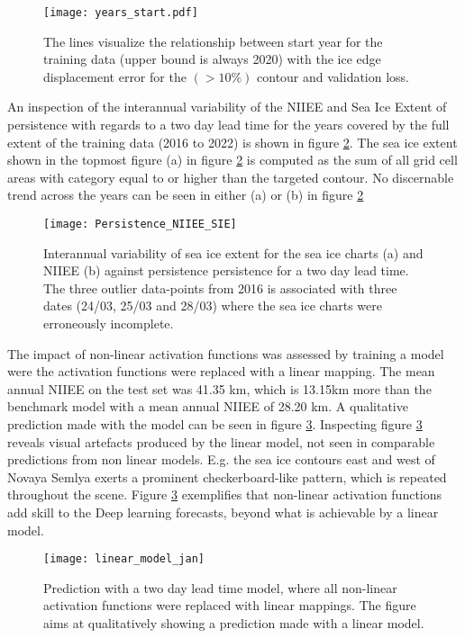 \documentclass[../main/thesis]{subfiles}
\begin{document}
\begin{figure}
    \centering
    \texttt{[image: years\_start.pdf]}
    \caption{\label{fig:append_years}The lines visualize the relationship between start year for the training data (upper bound is always 2020) with the ice edge displacement error for the $(> 10\%)$ contour and validation loss.}
\end{figure}

An inspection of the interannual variability of the NIIEE and Sea Ice Extent of persistence with regards to a two day lead time for the years covered by the full extent of the training data (2016 to 2022) is shown in figure \ref{fig:NIIEE-and-SIE}. The sea ice extent shown in the topmost figure (a) in figure \ref{fig:NIIEE-and-SIE} is computed as the sum of all grid cell areas with category equal to or higher than the targeted contour. No discernable trend across the years can be seen in either (a) or (b) in figure \ref{fig:NIIEE-and-SIE} 

\begin{figure}
    \centering
    \texttt{[image: Persistence\_NIIEE\_SIE]}
    \caption{\label{fig:NIIEE-and-SIE}Interannual variability of sea ice extent for the sea ice charts (a) and NIIEE (b) against persistence persistence for a two day lead time. The three outlier data-points from 2016 is associated with three dates (24/03, 25/03 and 28/03) where the sea ice charts were erroneously incomplete.}
\end{figure}

The impact of non-linear activation functions was assessed by training a model were the activation functions were replaced with a linear mapping. The mean annual NIIEE on the test set was 41.35 km, which is 13.15km more than the benchmark model with a mean annual NIIEE of 28.20 km. A qualitative prediction made with the model can be seen in figure \ref{fig:linear_model}. Inspecting figure \ref{fig:linear_model} reveals visual artefacts produced by the linear model, not seen in comparable predictions from non linear models. E.g. the sea ice contours east and west of Novaya Semlya exerts a prominent checkerboard-like pattern, which is repeated throughout the scene. Figure \ref{fig:linear_model} exemplifies that non-linear activation functions add skill to the Deep learning forecasts, beyond what is achievable by a linear model.

\begin{figure}
    \centering
    \texttt{[image: linear\_model\_jan]}
    \caption{\label{fig:linear_model}Prediction with a two day lead time model, where all non-linear activation functions were replaced with linear mappings. The figure aims at qualitatively showing a prediction made with a linear model.}
\end{figure}
\end{document}
